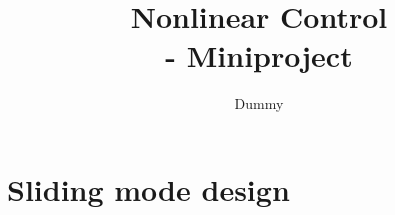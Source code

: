 


\title{\vspace{-2cm} Nonlinear Control \\ \Large - Miniproject}
\author{Dummy}


\maketitle


\chapter{Sliding mode design} %
\label{cha:sliding_mode_design}









